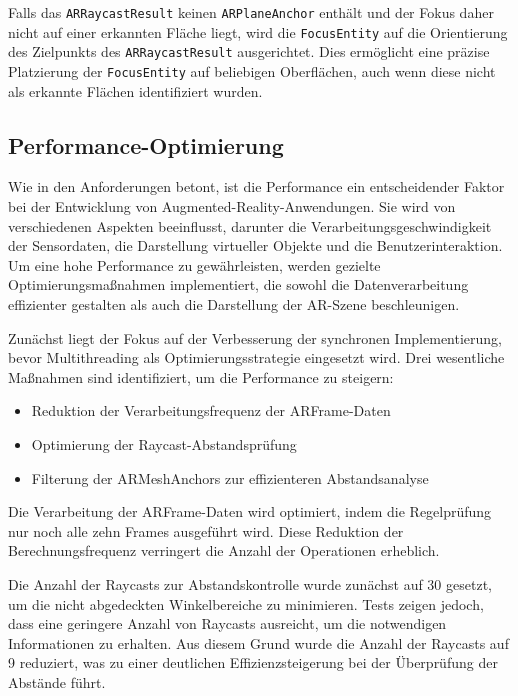Falls das \texttt{ARRaycastResult} keinen \texttt{ARPlaneAnchor} enthält und der Fokus daher nicht auf einer erkannten Fläche liegt, wird die \texttt{FocusEntity} auf die Orientierung des Zielpunkts des \texttt{ARRaycastResult} ausgerichtet. Dies ermöglicht eine präzise Platzierung der \texttt{FocusEntity} auf beliebigen Oberflächen, auch wenn diese nicht als erkannte Flächen identifiziert wurden.

\subsection{Performance-Optimierung}

Wie in den Anforderungen betont, ist die Performance ein entscheidender Faktor bei der Entwicklung von Augmented-Reality-Anwendungen. Sie wird von verschiedenen Aspekten beeinflusst, darunter die Verarbeitungsgeschwindigkeit der Sensordaten, die Darstellung virtueller Objekte und die Benutzerinteraktion. Um eine hohe Performance zu gewährleisten, werden gezielte Optimierungsmaßnahmen implementiert, die sowohl die Datenverarbeitung effizienter gestalten als auch die Darstellung der AR-Szene beschleunigen.

Zunächst liegt der Fokus auf der Verbesserung der synchronen Implementierung, bevor Multithreading als Optimierungsstrategie eingesetzt wird. Drei wesentliche Maßnahmen sind identifiziert, um die Performance zu steigern:

\begin{itemize}
\item Reduktion der Verarbeitungsfrequenz der ARFrame-Daten
\item Optimierung der Raycast-Abstandsprüfung
\item Filterung der ARMeshAnchors zur effizienteren Abstandsanalyse
\end{itemize}

Die Verarbeitung der ARFrame-Daten wird optimiert, indem die Regelprüfung nur noch alle zehn Frames ausgeführt wird. Diese Reduktion der Berechnungsfrequenz verringert die Anzahl der Operationen erheblich.

Die Anzahl der Raycasts zur Abstandskontrolle wurde zunächst auf 30 gesetzt, um die nicht abgedeckten Winkelbereiche zu minimieren. Tests zeigen jedoch, dass eine geringere Anzahl von Raycasts ausreicht, um die notwendigen Informationen zu erhalten. Aus diesem Grund wurde die Anzahl der Raycasts auf 9 reduziert, was zu einer deutlichen Effizienzsteigerung bei der Überprüfung der Abstände führt.

